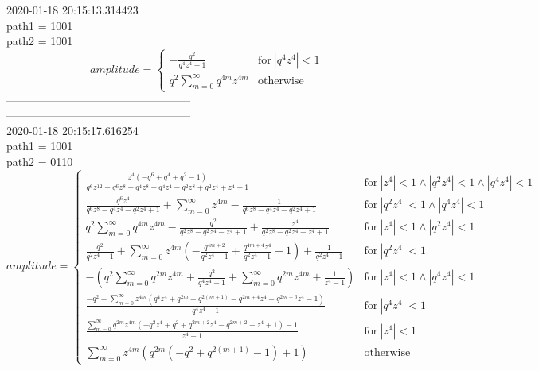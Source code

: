 \documentclass{jsreport}
\begin{document}
2020-01-18 20:15:13.314423\\
path1 = 1001\\
path2 = 1001\\
$$amplitude = \begin{cases} - \frac{q^{2}}{q^{4} z^{4} - 1} & \text{for}\: \left|{q^{4} z^{4}}\right| < 1 \\q^{2} \sum_{m=0}^{\infty} q^{4 m} z^{4 m} & \text{otherwise} \end{cases}$$
--------------------------------------------------\\
--------------------------------------------------\\
2020-01-18 20:15:17.616254\\
path1 = 1001\\
path2 = 0110\\
$$amplitude = \begin{cases} \frac{z^{4} \left(- q^{6} + q^{4} + q^{2} - 1\right)}{q^{6} z^{12} - q^{6} z^{8} - q^{4} z^{8} + q^{4} z^{4} - q^{2} z^{8} + q^{2} z^{4} + z^{4} - 1} & \text{for}\: \left|{z^{4}}\right| < 1 \wedge \left|{q^{2} z^{4}}\right| < 1 \wedge \left|{q^{4} z^{4}}\right| < 1 \\\frac{q^{6} z^{4}}{q^{6} z^{8} - q^{4} z^{4} - q^{2} z^{4} + 1} + \sum_{m=0}^{\infty} z^{4 m} - \frac{1}{q^{6} z^{8} - q^{4} z^{4} - q^{2} z^{4} + 1} & \text{for}\: \left|{q^{2} z^{4}}\right| < 1 \wedge \left|{q^{4} z^{4}}\right| < 1 \\q^{2} \sum_{m=0}^{\infty} q^{4 m} z^{4 m} - \frac{q^{2}}{q^{2} z^{8} - q^{2} z^{4} - z^{4} + 1} + \frac{z^{4}}{q^{2} z^{8} - q^{2} z^{4} - z^{4} + 1} & \text{for}\: \left|{z^{4}}\right| < 1 \wedge \left|{q^{2} z^{4}}\right| < 1 \\\frac{q^{2}}{q^{2} z^{4} - 1} + \sum_{m=0}^{\infty} z^{4 m} \left(- \frac{q^{4 m + 2}}{q^{2} z^{4} - 1} + \frac{q^{4 m + 4} z^{4}}{q^{2} z^{4} - 1} + 1\right) + \frac{1}{q^{2} z^{4} - 1} & \text{for}\: \left|{q^{2} z^{4}}\right| < 1 \\- (q^{2} \sum_{m=0}^{\infty} q^{2 m} z^{4 m} + \frac{q^{2}}{q^{4} z^{4} - 1} + \sum_{m=0}^{\infty} q^{2 m} z^{4 m} + \frac{1}{z^{4} - 1}) & \text{for}\: \left|{z^{4}}\right| < 1 \wedge \left|{q^{4} z^{4}}\right| < 1 \\\frac{- q^{2} + \sum_{m=0}^{\infty} z^{4 m} \left(q^{4} z^{4} + q^{2 m} + q^{2 \left(m + 1\right)} - q^{2 m + 4} z^{4} - q^{2 m + 6} z^{4} - 1\right)}{q^{4} z^{4} - 1} & \text{for}\: \left|{q^{4} z^{4}}\right| < 1 \\\frac{\sum_{m=0}^{\infty} q^{2 m} z^{4 m} \left(- q^{2} z^{4} + q^{2} + q^{2 m + 2} z^{4} - q^{2 m + 2} - z^{4} + 1\right) - 1}{z^{4} - 1} & \text{for}\: \left|{z^{4}}\right| < 1 \\\sum_{m=0}^{\infty} z^{4 m} \left(q^{2 m} \left(- q^{2} + q^{2 \left(m + 1\right)} - 1\right) + 1\right) & \text{otherwise} \end{cases}$$
\end{document}
